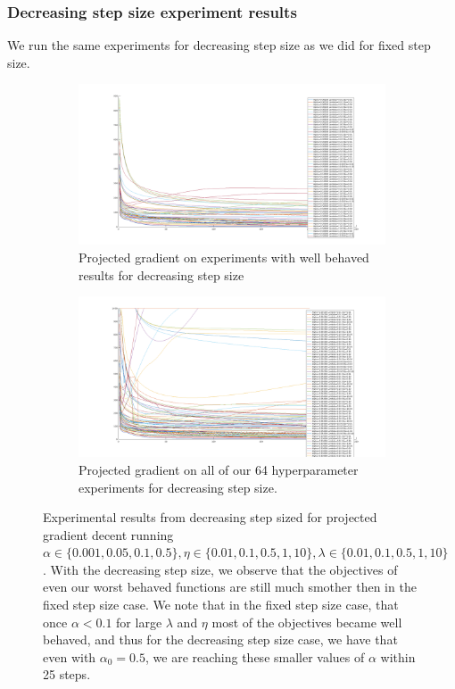 \documentclass{article}
\newcommand{\0}{\mathrm{0}}
\newcommand{\1}{\mathrm{1}}
\begin{document}
\subsubsection{Decreasing step size experiment results}
We run the same experiments for decreasing step size as we did for fixed step size.
\begin{figure}[H]
  \begin{subfigure}[b]{\textwidth}
    \includegraphics[width=\textwidth]{proj-gradient-dec-wellb.png}
    \caption{Projected gradient on experiments with well behaved results for decreasing step size}
  \end{subfigure}
  \begin{subfigure}[b]{\textwidth}
    \includegraphics[width=\textwidth]{proj-gradient-dec-all.png}
    \caption{Projected gradient on all of our 64 hyperparameter experiments for decreasing step size.}
  \end{subfigure}
  \caption{Experimental results from decreasing step sized for projected gradient decent running $\alpha \in \{0.001, 0.05, 0.1, 0.5\}, \eta \in \{ 0.01, 0.1, 0.5, 1, 10 \}, \lambda \in \{ 0.01, 0.1, 0.5, 1, 10\} $.
    With the decreasing step size, we observe that the objectives of even our worst behaved functions are still much smother then in the fixed step size case.  We note that in the fixed step size case, that once $\alpha < 0.1$ for large $\lambda$ and $\eta$ most of the objectives became well behaved, and thus for the decreasing step size case, we have that even with $\alpha_0 = 0.5$, we are reaching these smaller values of $\alpha$ within 25 steps.
  }
\end{figure}
\end{document}
